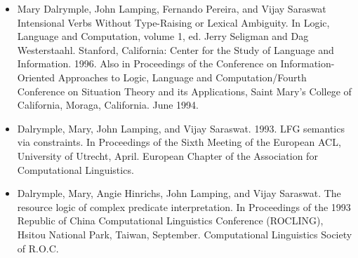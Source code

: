 \documentclass{article}
\begin{document}
\begin{itemize}
\item    Mary Dalrymple, John Lamping, Fernando Pereira, and Vijay Saraswat
    Intensional Verbs Without Type-Raising or Lexical Ambiguity.
    In Logic, Language and Computation, volume 1, ed. Jerry
    Seligman and Dag Westerstaahl. Stanford, California:
    Center for the Study of Language and Information.  1996.
    Also in Proceedings of the Conference on
    Information-Oriented Approaches to Logic, Language and
    Computation/Fourth Conference on Situation Theory and its 
    Applications, Saint Mary's College of California, Moraga,
    California. June 1994.

\item    Dalrymple, Mary, John Lamping, and Vijay Saraswat. 1993.
    LFG semantics via constraints. In Proceedings of the Sixth
    Meeting of the European ACL, University of Utrecht, April.
    European Chapter of the Association for Computational
    Linguistics. 
    
\item    Dalrymple, Mary, Angie Hinrichs, John Lamping, and Vijay Saraswat.
    The resource logic of complex predicate interpretation.
    In Proceedings of the 1993 Republic of China Computational
    Linguistics Conference (ROCLING), Hsitou National Park,
    Taiwan, September. Computational Linguistics Society of R.O.C.
\end{itemize}
\end{document}
